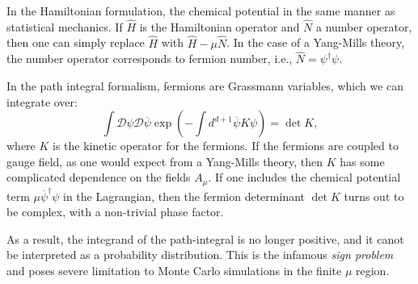 In the Hamiltonian formulation, the chemical potential in the same manner as statistical mechanics.
If $\hat{H}$ is the Hamiltonian operator and $\hat{N}$ a number operator, then one can simply replace $\hat{H}$ with $\hat{H} - \mu \hat{N}$.
In the case of a Yang-Mills theory, the number operator corresponds to fermion number, i.e., $\hat{N} = \psi^{\dagger} \psi$.

In the path integral formalism, fermions are Grassmann variables, which we can integrate over:
\begin{equation}
    \int \mathcal{D} \psi \mathcal{D} \overline{\psi} \exp(-\int d^{d+1} \overline{\psi} K \psi) = \det K,
\end{equation}
where $K$ is the kinetic operator for the fermions.
If the fermions are coupled to gauge field, as one would expect from a Yang-Mills theory, then $K$ has some complicated dependence on the fields $A_{\mu}$.
If one includes the chemical potential term $\mu \overline{\psi}^{\dagger} \psi$ in the Lagrangian, then the fermion determinant $\det K$ turns out to be complex\citneeded, with a non-trivial phase factor.

As a result, the integrand of the path-integral is no longer positive, and it canot be interpreted as a probability distribution.
This is the infamous \emph{sign problem} and poses severe limitation to Monte Carlo simulations in the finite $\mu$ region.
